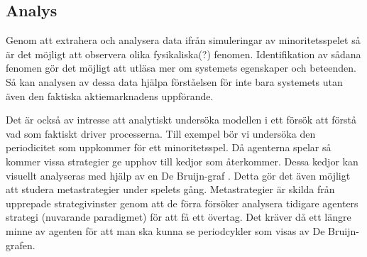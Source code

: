 
\subsection{Analys}

Genom att extrahera och analysera data ifrån simuleringar av minoritetsspelet så är det möjligt att observera olika fysikaliska(?) fenomen. Identifikation av sådana fenomen gör det möjligt att utläsa mer om systemets egenskaper och beteenden. Så kan analysen av dessa data hjälpa förståelsen för inte bara systemets utan även den faktiska aktiemarknadens uppförande. 

Det är också av intresse att analytiskt undersöka modellen i ett försök att förstå vad som faktiskt driver processerna. Till exempel bör vi undersöka den periodicitet som uppkommer för ett minoritetsspel. Då agenterna spelar så kommer vissa strategier ge upphov till kedjor som återkommer. Dessa kedjor kan visuellt analyseras med hjälp av en De Bruijn-graf \cite{Periodicity}. Detta gör det även möjligt att studera metastrategier under spelets gång. Metastrategier är skilda från upprepade strategivinster genom att de förra försöker analysera tidigare agenters strategi (nuvarande paradigmet) för att få ett övertag. Det kräver då ett längre minne av agenten för att man ska kunna se periodcykler som visas av De Bruijn-grafen.








